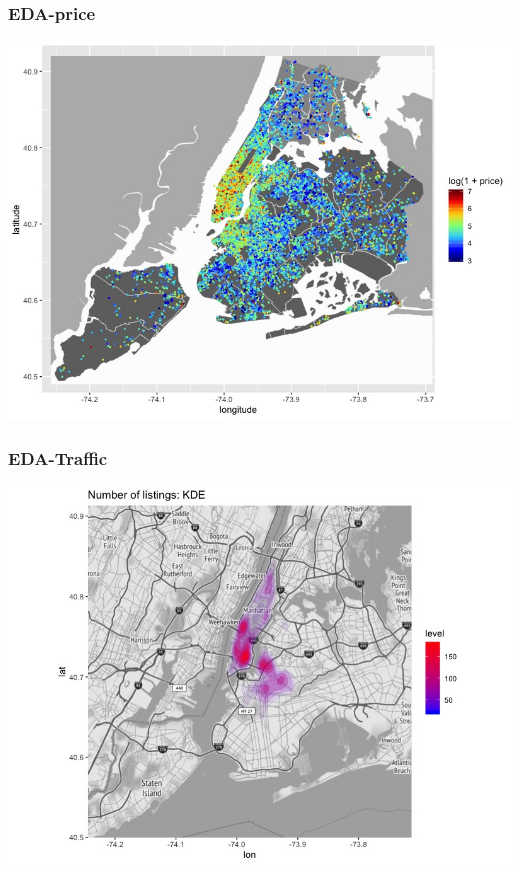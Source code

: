 \documentclass{beamer}
\begin{document}
\begin{frame}
    \frametitle{EDA-price}
\includegraphics[scale=0.4]{price.jpeg}
\end{frame}

\begin{frame}
    \frametitle{EDA-Traffic}
\includegraphics[scale=0.4]{KDE.jpeg}
\end{frame}
\end{document}
